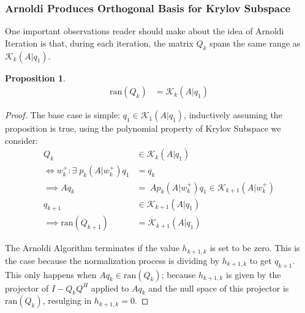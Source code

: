 \documentclass[]{article}
\theoremstyle{definition}
\newtheorem{prop}{Proposition}[section]  %
\begin{document}
        \subsubsection{Arnoldi Produces Orthogonal Basis for Krylov Subspace}
            One important observations reader should make about the idea of Arnoldi Iteration is that, during each iteration, the matrix $Q_k$ spans the same range as $\mathcal K_k(A|q_1)$. 
            \begin{prop}
                \begin{align}
                    \text{ran}(Q_k) &= \mathcal K_k(A|q_1)
                \end{align}
            \end{prop}
            \begin{proof}
                The base case is simple: $q_1 \in \mathcal K_1(A|q_1)$, inductively assuming the proposition is true, using the polynomial property of Krylov Subspace we consider: 
                $$
                \begin{aligned}
                    Q_k &\in \mathcal K_k(A|q_1)
                    \\
                    \iff w_k^+: \exists\; p_k(A|w_k^+)q_1 &= q_k
                    \\
                    \implies Aq_k &= \; Ap_k(A|w_k^+)q_1 \in \mathcal K_{k + 1}(A|w_k^+)
                    \\
                    q_{k + 1} &\in \mathcal K_{k + 1}(A|q_{1})
                    \\
                    \implies \text{ran}(Q_{k + 1}) &= \mathcal K_{k + 1}(A|q_1)
                \end{aligned}
                $$

                The Arnoldi Algorithm terminates if the value $h_{k + 1, k}$ is set to be zero. This is the case because the normalization process is dividing by $h_{k + 1, k}$ to get $q_{k + 1}$. This only happens when $Aq_{k}\in \text{ran}(Q_k)$; because $h_{k +1, k}$ is given by the projector of $I - Q_kQ^H$ applied to $Aq_k$ and the null space of this projector is $\text{ran}(Q_k)$, resulging in $h_{k + 1, k} = 0$. 
            \end{proof}
\end{document}
